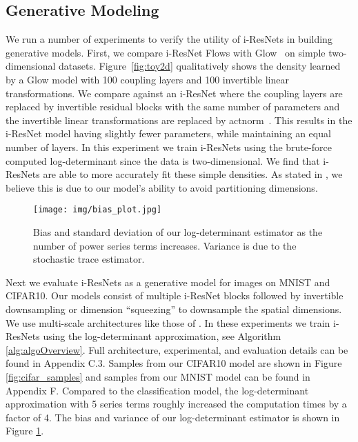\documentclass{article}
\begin{document}
\subsection{Generative Modeling}
We run a number of experiments to verify the utility of i-ResNets in building generative models.
First, we compare i-ResNet Flows with Glow~\citep{kingma2018glow} on simple two-dimensional datasets.
Figure~\ref{fig:toy2d} qualitatively shows the density learned by a Glow model with 100 coupling layers and 100 invertible linear transformations. We compare against an i-ResNet where the coupling layers are replaced by invertible residual blocks with the same number of parameters and the invertible linear transformations are replaced by actnorm~\citep{kingma2018glow}. This results in the i-ResNet model having slightly fewer parameters, while maintaining an equal number of layers. In this experiment we train i-ResNets using the brute-force computed log-determinant since the data is two-dimensional. We find that i-ResNets are able to more accurately fit these simple densities.
As stated in \citet{ffjord}, we believe this is due to our model's ability to avoid partitioning dimensions. 

\begin{figure}[b]
    \centering
    \texttt{[image: img/bias\_plot.jpg]}
    \vspace{-5mm}
    \caption{Bias and standard deviation of our log-determinant estimator as the number of power series terms increases. Variance is due to the stochastic trace estimator.}
\label{fig:biasPlot}
\end{figure}

Next we evaluate i-ResNets as a generative model for images on MNIST and CIFAR10. Our models consist of multiple i-ResNet blocks followed by invertible downsampling or dimension ``squeezing'' to downsample the spatial dimensions. We use multi-scale architectures like those of \citet{dinh2016density, kingma2018glow}. In these experiments we train i-ResNets using the log-determinant approximation, see Algorithm \ref{alg:algoOverview}. Full architecture, experimental, and evaluation details can be found in Appendix C.3. Samples from our CIFAR10 model are shown in Figure \ref{fig:cifar_samples} and samples from our MNIST model can be found in Appendix F. Compared to the classification model, the log-determinant approximation with 5 series terms roughly increased the computation times by a factor of 4. The bias and variance of our log-determinant estimator is shown in Figure \ref{fig:biasPlot}.
\end{document}
